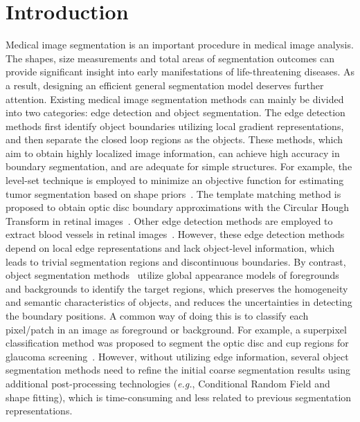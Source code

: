 \documentclass[runningheads,a4paper]{llncs}
\begin{document}
\section{Introduction}
\label{sec:introdution}
Medical image segmentation is an important procedure in medical image analysis. The shapes, size measurements and total areas of segmentation outcomes can provide significant insight into early manifestations of life-threatening diseases. As a result, designing an efficient general segmentation model deserves further attention. Existing medical image segmentation methods can mainly be divided into two categories: edge detection and object segmentation. The edge detection methods first identify object boundaries utilizing local gradient representations, and then separate the closed loop regions as the objects. These methods, which aim to obtain highly localized image information, can achieve high accuracy in boundary segmentation, and are adequate for simple structures. For example, the level-set technique is employed to minimize an objective function for estimating tumor segmentation based on shape priors~\cite{levelset2003}. The template matching method is proposed to obtain optic disc boundary approximations with the Circular Hough Transform in retinal images~\cite{Aquino2010}. Other edge detection methods are employed to extract blood vessels in retinal images~\cite{deepvessel2016,MOCCIA201871}. However, these edge detection methods depend on local edge representations and lack object-level information, which leads to trivial segmentation regions and discontinuous boundaries. By contrast, object segmentation methods~\cite{salient,Gu2019} utilize global appearance models of foregrounds and backgrounds to identify the target regions, which preserves the homogeneity and semantic characteristics of objects, and reduces the uncertainties in detecting the boundary positions. A common way of doing this is to classify each pixel/patch in an image as foreground or background. For example, a superpixel classification method was proposed to segment the optic disc and cup regions for glaucoma screening~\cite{Cheng2013}.  However, without utilizing edge information, several object segmentation methods need to refine the initial coarse segmentation results using additional post-processing technologies (\textit{e.g.}, Conditional Random Field and shape fitting), which is time-consuming and less related to previous segmentation representations.
\end{document}
